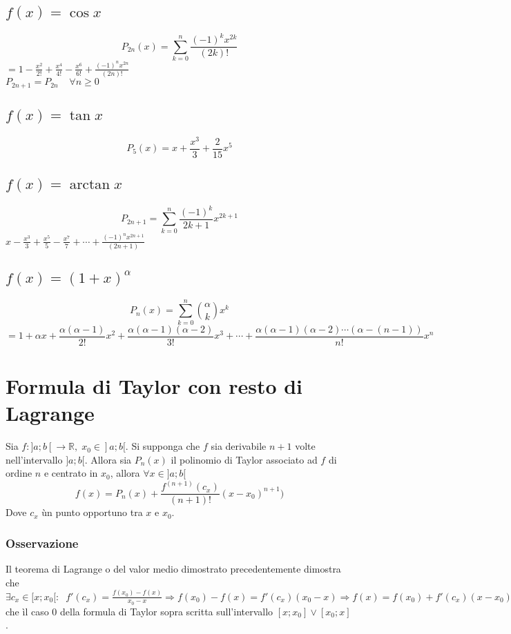 \subsection{$f(x)=\cos x$}
\begin{equation}
P_{2n}(x)=\sum\limits_{k=0}^n\dfrac{(-1)^kx^{2k}}{(2k)!}
\end{equation}
$=1-\frac{x^2}{2!}+\frac{x^4}{4!}-\frac{x^6}{6!}+\frac{(-1)^{n}x^{2n}}{(2n)!}$\\
$P_{2n+1}=P_{2n}\;\;\;\;\forall n\ge 0$
\subsection{$f(x)=\tan x$}
\begin{equation}
P_5(x)=x+\dfrac{x^3}{3}+\dfrac{2}{15}x^5
\end{equation}
\subsection{$f(x)=\arctan x$}
\begin{equation}
P_{2n+1}=\sum\limits_{k=0}^n\dfrac{(-1)^k}{2k+1}x^{2k+1}
\end{equation}
$x-\frac{x^3}{3}+\frac{x^5}{5}-\frac{x^7}{7}+\cdots+\frac{(-1)^nx^{2n+1}}{(2n+1)}$
\subsection{$f(x)=(1+x)^\alpha$}
\begin{equation}
P_n(x)=\sum\limits_{k=0}^n\binom{\alpha}{k}x^k
\end{equation}
$=1+\alpha x+\dfrac{\alpha(\alpha-1)}{2!}x^2+\dfrac{\alpha(\alpha-1)(\alpha-2)}{3!}x^3+\cdots+\dfrac{\alpha(\alpha-1)(\alpha-2)\cdots(\alpha-(n-1))}{n!}x^n$

\section{Formula di Taylor con resto di Lagrange}
Sia $f:]a;b[\rightarrow\mathbb{R},\;x_0\in]a;b[$. Si supponga che $f$ sia derivabile $n+1$ volte nell'intervallo $]a;b[$. Allora sia $P_n(x)$ il polinomio di Taylor associato ad
$f$ di ordine $n$ e centrato in $x_0$, allora $\forall x\in ]a;b[$
\begin{equation}
f(x)=P_n(x)+\frac{f^{(n+1)}(c_x)}{(n+1)!}(x-x_0)^{n+1})
\end{equation}
Dove $c_x$ \` un punto opportuno tra $x$ e $x_0$. 
\subsubsection{Osservazione}
Il teorema di Lagrange o del valor medio dimostrato precedentemente dimostra che $\exists c_x\in [x;x_0[:\;\;f'(c_x)=\frac{f(x_0)-f(x)}{x_0-x}\Rightarrow f(x_0)-f(x)=f'(c_x)(x_0-
x)\Rightarrow f(x)=f(x_0)+f'(c_x)(x-x_0)$ che \` il caso $0$ della formula di Taylor sopra scritta sull'intervallo $[x;x_0]\lor [x_0;x]$.
